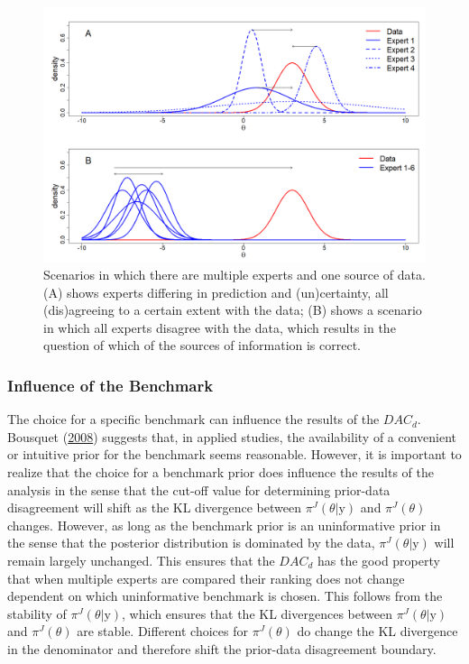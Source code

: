 \documentclass[openright,titlepage,12pt,a4paper]{book}
\begin{document}
\begin{figure}

{\centering \includegraphics[width=0.9\linewidth]{figures/chapter_3/Figure3} 

}

\caption{Scenarios in which there are multiple experts and one source of data. (A) shows experts differing in prediction and (un)certainty, all (dis)agreeing to a certain extent with the data; (B) shows a scenario in which all experts disagree with the data, which results in the question of which of the sources of information is correct.}\label{fig:ch03fig3}
\end{figure}

\hypertarget{influence-of-the-benchmark}{%
\subsubsection{Influence of the Benchmark}\label{influence-of-the-benchmark}}

The choice for a specific benchmark can influence the results of the \(DAC_d\). Bousquet (\protect\hyperlink{ref-bousquet_diagnostics_2008}{2008}) suggests that, in applied studies, the availability of a convenient or intuitive prior for the benchmark seems reasonable. However, it is important to realize that the choice for a benchmark prior does influence the results of the analysis in the sense that the cut-off value for determining prior-data disagreement will shift as the KL divergence between \(\pi^J(\theta|\textrm{y})\) and \(\pi^J(\theta)\) changes. However, as long as the benchmark prior is an uninformative prior in the sense that the posterior distribution is dominated by the data, \(\pi^J(\theta|\textrm{y})\) will remain largely unchanged. This ensures that the \(DAC_d\) has the good property that when multiple experts are compared their ranking does not change dependent on which uninformative benchmark is chosen. This follows from the stability of \(\pi^J(\theta|\textrm{y})\), which ensures that the KL divergences between \(\pi^J(\theta|\textrm{y})\) and \(\pi^J(\theta)\) are stable. Different choices for \(\pi^J(\theta)\) do change the KL divergence in the denominator and therefore shift the prior-data disagreement boundary.
\end{document}
